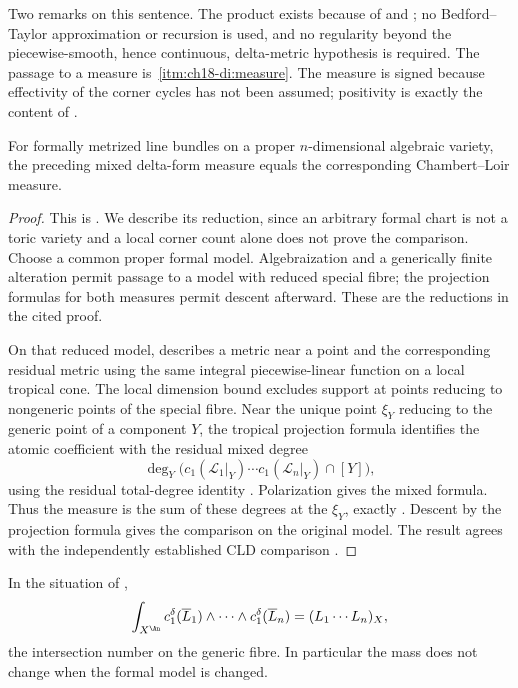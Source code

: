 Two remarks on this sentence.  The product exists because of
 and ; no
Bedford--Taylor approximation or recursion is used, and no regularity beyond
the piecewise-smooth, hence continuous, delta-metric hypothesis is required.
The passage to a measure is
\,\cref{itm:ch18-di:measure}.  The measure
is signed because effectivity of the corner cycles has not been assumed;
positivity is exactly the content of .

\begin{theorem}\label{thm:gk-delta-cl-measure}
For formally metrized line bundles on a proper $n$-dimensional algebraic
variety, the preceding mixed delta-form measure equals the corresponding
Chambert--Loir measure.
\end{theorem}
\begin{proof}
This is \cite[Theorem~10.5]{GK17}.  We describe its reduction, since an
arbitrary formal chart is not a toric variety and a local corner count alone
does not prove the comparison.  Choose a common proper formal model.
Algebraization and a generically finite alteration permit passage to a
model with reduced special fibre; the projection formulas for both measures
permit descent afterward.  These are the reductions in the cited proof.

On that reduced model, \cite[Lemma~10.8]{GK17} describes a metric near a
point and the corresponding residual metric using the same integral
piecewise-linear function on a local tropical cone.  The local dimension
bound excludes support at points reducing to nongeneric points of the
special fibre.  Near the unique point $\xi_Y$ reducing to the generic point
of a component $Y$, the tropical projection formula identifies the atomic
coefficient with the residual mixed degree
\[
 \deg_Y\bigl(c_1(\mathcal L_1|_Y)\cdots
                 c_1(\mathcal L_n|_Y)\cap[Y]\bigr),
\]
using the residual total-degree identity
\cite[Proposition~10.3]{GK17}.  Polarization gives the mixed formula.
Thus the measure is the sum of these degrees at the $\xi_Y$, exactly
\cite[Proposition~10.4(c)]{GK17}.  Descent by the projection formula gives
the comparison on the original model.  The result agrees with the
independently established CLD comparison .
\end{proof}

\begin{corollary}
\label{cor:ch18-delta-total-mass}
In the situation of ,
\[
 \int_{X^{\An}}c_1^\delta(\overline L_1)\wedge\cdots\wedge
 c_1^\delta(\overline L_n)=(L_1\cdots L_n)_X ,
\]
the intersection number on the generic fibre.  In particular the mass does
not change when the formal model is changed.
\end{corollary}

